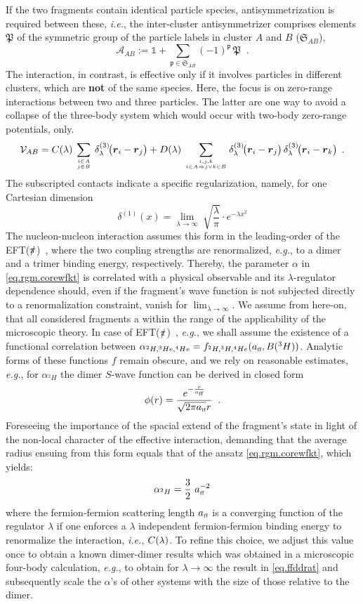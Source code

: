 \documentclass[onecolumn,preprint,superscriptaddress,nofootinbib,notitlepage,10pt,linenumbers]{revtex4-1}
\newcommand{\eftnopi}{\mbox{EFT($\slashed{\pi}$) }}
\newcommand{\la}{\label}
\newcommand{\be}{\begin{equation}}
\newcommand{\ee}{\end{equation}}
\newcommand{\eg}{\textit{e.g.}\;}
\newcommand{\ie}{\textit{i.e.}\;}
\newcommand{\ve}[1]{\ensuremath{\boldsymbol{#1}}}
\newcommand{\ddrei}[1]{\delta_{\tiny \lambda}^{(3)}\!\big(#1\big)}
\newcommand{\cc}{\ensuremath C(\lambda)}
\newcommand{\dd}{\ensuremath D(\lambda)}
\newcommand{\aff}{\ensuremath a_{\text{\tiny ff}}}
\begin{document}
If the two fragments contain identical particle species, antisymmetrization is required between these, \ie,
the inter-cluster antisymmetrizer comprises elements $\mathfrak{P}$ of the symmetric group of the particle labels
in cluster $A$ and $B$ ($\mathfrak{S}_{AB}$),   
\be\la{eq.asymmetr}
\mathcal{A}_{AB}:=\mathbb{1}+\sum_{\mathfrak{p}\in \mathfrak{S}_{AB}}(-1)^{\mathfrak{p}}\,\mathfrak{P}\;\;.
\ee 
The interaction, in contrast, is effective only if it involves particles in different clusters, which are {\bf not} of
the same species. Here, the focus is on zero-range interactions between two and three particles. The latter are one
way to avoid a collapse of the three-body system which would occur with two-body zero-range potentials, only.
\be\la{eq.int}
\mathcal{V}_{AB}=\cc\,\sum_{i\in A\atop j\in B}\,\ddrei{\ve{r}_i-\ve{r}_j}+
\dd\,\sum_{i,j,k\atop i\in A\Rightarrow j\vee k\in B}\ddrei{\ve{r}_i-\ve{r}_j}\,\ddrei{\ve{r}_i-\ve{r}_k}\;\,.
\ee
The subscripted contacts indicate a specific regularization, namely, for one Cartesian dimension
\be\la{eq.delta}
\delta^{(1)}(x)=\lim_{\lambda\to\infty}~\sqrt{\frac{\lambda}{\pi}}\cdot e^{-\lambda x^2}
\ee
The nucleon-nucleon interaction assumes this form in the leading-order of the \eftnopi, where the two coupling strengths
are renormalized, \eg, to a dimer and a trimer binding energy, respectively.
Thereby, the parameter $\alpha$ in \eqref{eq.rgm.corewfkt} is correlated with a physical observable and its $\lambda$-regulator
dependence should, even if the fragment's wave function is not subjected directly to a renormalization constraint, vanish
for $\lim_{\lambda\to\infty}$. We assume from here-on, that all considered fragments a within the range of the applicability of the
microscopic theory. In case of \eftnopi, \eg, we shall assume the existence of a functional correlation between
$\alpha_{^2H,^3He,^4He}=f_{^2H,^3H,^4He}(\aff,B(^3H))$. Analytic forms of these functions $f$ remain obscure,
and we rely on reasonable estimates, \eg, for $\alpha_{^2H}$ the dimer $S$-wave function can be derived in closed form
\be
\phi(r)=\frac{e^{-\frac{r}{\aff}}}{\sqrt{2\pi \aff}r}\;\;.
\ee
Foreseeing the importance of the spacial extend of the fragment's state in light of the non-local character of the effective
interaction, demanding that the average radius ensuing from this form equals that of the ansatz \eqref{eq.rgm.corewfkt}, which
yields:
\be
\alpha_{^2H}=\frac{3}{2}\,\,\aff^{-2}
\ee
where the fermion-fermion scattering length $\aff$ is a converging function of the regulator $\lambda$ if one
enforces a $\lambda$ independent fermion-fermion binding energy to renormalize the interaction, \ie, $\cc$.
To refine this choice, we adjust this value once to obtain a known dimer-dimer results which was obtained in a
microscopic four-body calculation, \eg, to obtain for $\lambda\to\infty$ the result in \eqref{eq.ffddrat} and subsequently
scale the $\alpha$'s of other systems with the size of those relative to the dimer.
\end{document}
